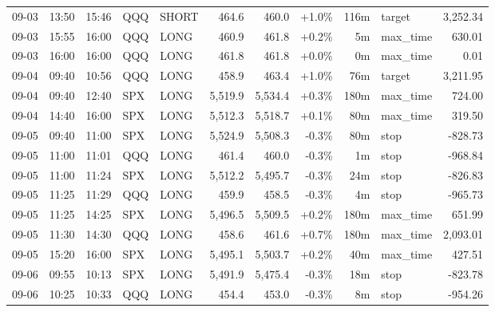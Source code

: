 \documentclass[11pt,a4paper,twoside]{article}
\begin{document}
\begin{center}
\begin{longtable}{>{\color{txtmain}}l l l l l r r r r >{\color{txtmain}}l r}
09-03 & 13:50 & 15:46 & QQQ & SHORT & 464.6 & 460.0 & \textcolor{wingreen}{+1.0\%} & 116m & target & \textcolor{wingreen}{3,252.34} \\
09-03 & 15:55 & 16:00 & QQQ & LONG & 460.9 & 461.8 & \textcolor{wingreen}{+0.2\%} & 5m & max\_time & \textcolor{wingreen}{630.01} \\
09-03 & 16:00 & 16:00 & QQQ & LONG & 461.8 & 461.8 & \textcolor{wingreen}{+0.0\%} & 0m & max\_time & \textcolor{wingreen}{0.01} \\
09-04 & 09:40 & 10:56 & QQQ & LONG & 458.9 & 463.4 & \textcolor{wingreen}{+1.0\%} & 76m & target & \textcolor{wingreen}{3,211.95} \\
09-04 & 09:40 & 12:40 & SPX & LONG & 5,519.9 & 5,534.4 & \textcolor{wingreen}{+0.3\%} & 180m & max\_time & \textcolor{wingreen}{724.00} \\
09-04 & 14:40 & 16:00 & SPX & LONG & 5,512.3 & 5,518.7 & \textcolor{wingreen}{+0.1\%} & 80m & max\_time & \textcolor{wingreen}{319.50} \\
09-05 & 09:40 & 11:00 & SPX & LONG & 5,524.9 & 5,508.3 & \textcolor{lossred}{-0.3\%} & 80m & stop & \textcolor{lossred}{-828.73} \\
09-05 & 11:00 & 11:01 & QQQ & LONG & 461.4 & 460.0 & \textcolor{lossred}{-0.3\%} & 1m & stop & \textcolor{lossred}{-968.84} \\
09-05 & 11:00 & 11:24 & SPX & LONG & 5,512.2 & 5,495.7 & \textcolor{lossred}{-0.3\%} & 24m & stop & \textcolor{lossred}{-826.83} \\
09-05 & 11:25 & 11:29 & QQQ & LONG & 459.9 & 458.5 & \textcolor{lossred}{-0.3\%} & 4m & stop & \textcolor{lossred}{-965.73} \\
09-05 & 11:25 & 14:25 & SPX & LONG & 5,496.5 & 5,509.5 & \textcolor{wingreen}{+0.2\%} & 180m & max\_time & \textcolor{wingreen}{651.99} \\
09-05 & 11:30 & 14:30 & QQQ & LONG & 458.6 & 461.6 & \textcolor{wingreen}{+0.7\%} & 180m & max\_time & \textcolor{wingreen}{2,093.01} \\
09-05 & 15:20 & 16:00 & SPX & LONG & 5,495.1 & 5,503.7 & \textcolor{wingreen}{+0.2\%} & 40m & max\_time & \textcolor{wingreen}{427.51} \\
09-06 & 09:55 & 10:13 & SPX & LONG & 5,491.9 & 5,475.4 & \textcolor{lossred}{-0.3\%} & 18m & stop & \textcolor{lossred}{-823.78} \\
09-06 & 10:25 & 10:33 & QQQ & LONG & 454.4 & 453.0 & \textcolor{lossred}{-0.3\%} & 8m & stop & \textcolor{lossred}{-954.26} \\

\end{longtable}
\end{center}
\end{document}
